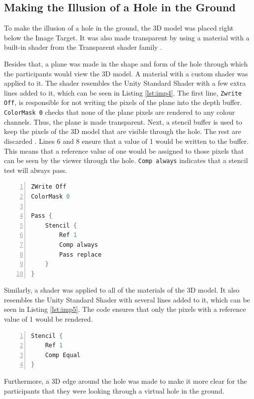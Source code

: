 \subsection{Making the Illusion of a Hole in the Ground}
To make the illusion of a hole in the ground, the 3D model was placed right below the Image Target. It was also made transparent by using a material with a built-in shader from the Transparent shader family \cite{unity_legacy_shaders}.

Besides that, a plane was made in the shape and form of the hole through which the participants would view the 3D model. A material with a custom shader was applied to it. The shader resembles the Unity Standard Shader \cite{unity_standard_shader} with  a few extra lines added to it, which can be seen in Listing \ref{lst:imp4}. The first line, \texttt{Zwrite Off}, is responsible for not writing the pixels of the plane into the depth buffer. \texttt{ColorMask 0} checks that none of the plane pixels are rendered to any colour channels. Thus, the plane is made transparent. Next, a stencil buffer is used to keep the pixels of the 3D model that are visible through the hole. The rest are discarded \cite{stencil_buffer}. Lines 6 and 8 ensure that a value of 1 would be written to the buffer. This means that a reference value of one would be assigned to those pixels that can be seen by the viewer through the hole. \texttt{Comp always} indicates that a stencil test will always pass.

\begin{lstlisting}[language=C, numbers=left, caption={Extra code for the hole}, label=lst:imp4, captionpos=b]
ZWrite Off
ColorMask 0

Pass {
	Stencil {
		Ref 1
		Comp always
		Pass replace
	}
}
\end{lstlisting}

Similarly, a shader was applied to all of the materials of the 3D model. It also resembles the Unity Standard Shader with several lines added to it, which can be seen in Listing \ref{lst:imp5}. The code ensures that only the pixels with a reference value of 1 would be rendered.

\begin{lstlisting}[language=C, numbers=left, caption={Extra code for the 3D model}, label=lst:imp5, captionpos=b]
Stencil {
	Ref 1
	Comp Equal
}
\end{lstlisting}

Furthermore, a 3D edge around the hole was made to make it more clear for the participants that they were looking through a virtual hole in the ground.

